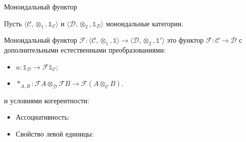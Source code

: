 \begin{defin} Моноидальный функтор

  Пусть $\langle \mathcal{C}, \otimes_1, \mathds{1}_{\mathcal{C}} \rangle$ и $\langle \mathcal{D}, \otimes_2, \mathds{1}_{\mathcal{D}} \rangle$ моноидальные категории.

  Моноидальный функтор $\mathcal{F} : \langle \mathcal{C}, \otimes_1, \mathds{1} \rangle \to \langle \mathcal{D}, \otimes_2, \mathds{1}' \rangle$ это функтор
  $\mathcal{F} : \mathcal{C} \to \mathcal{D}$ с дополнительными естественными преобразованиями:

  \begin{itemize}
  \item $u : \mathds{1}_{\mathcal{D}} \to \mathcal{F}\mathds{1}_{\mathcal{C}}$;
  \item $\ast_{A, B} : \mathcal{F}A \otimes_{\mathcal{D}} \mathcal{F}B \to \mathcal{F}(A \otimes_{\mathcal{C}} B)$.
  \end{itemize}

  и условиями когерентности:

  \begin{itemize}
    \item Ассоциативность:


    \item Свойство левой единицы:



\end{itemize}
\end{defin}
